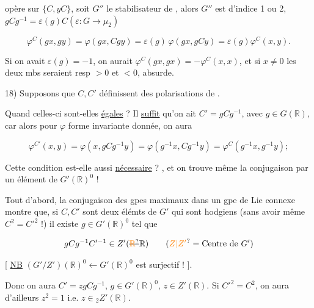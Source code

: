 opère sur $\{C,yC\}$,  soit $G''$ le stabilisateur de , alors $G''$ est d'indice 1 ou 2,    $gCg^{-1}=\varepsilon(g)C$\quad $(\varepsilon:G\longrightarrow\mu_2)$

\[
\varphi^C(gx,gy)=\varphi(gx,Cgy)=\varepsilon(g)\,\varphi(gx,gCy)=\varepsilon(g)\varphi^C(x,y).
\]


Si on avait $\varepsilon(g)=-1$, on aurait $\varphi^C(gx,gx)=-\varphi^C(x,x)$, et si $x\ne0$ les deux mbs seraient resp $>0$ et $<0$, absurde.


18) Supposons que $C,C'$ \deleted{\unsure{$\in$}}  définissent des polarisations de  .

Quand celles-ci sont-elles \uline{égales} ? Il \uline{suffit} qu'on ait $C'=gCg^{-1}$, avec $g\in G(\mathbb R)$, car alors pour $\varphi$ forme invariante donnée, on aura

\[
\varphi^{C'}(x,y)=\varphi(x,gCg^{-1}y)=\varphi(g^{-1}x,Cg^{-1}y)=\varphi^C(g^{-1}x,g^{-1}y);
\]

Cette condition est-elle aussi \uline{nécessaire} ? ,   et on trouve même \unsure{$=$} la conjugaison par un élément de $G'(\mathbb R)^0$ !


Tout d'abord, la conjugaison des gpes maximaux dans un gpe de Lie connexe montre que,  si $C,C'$ sont deux élémts de $G'$ qui sont hodgiens (sans avoir même $C^2=C'^2$ !) il existe $g\in G'(\mathbb R)^0$ tel que

\[
gCg^{-1}C'^{-1}\in Z'(\deleted{\unsure{\mathbb R}}\mathbb R)\qquad (\unsure{Z|Z'}=\text{Centre de }G')
\]

[ \uline{NB} $(G'/Z')(\mathbb R)^0\longleftarrow G'(\mathbb R)^0$ est surjectif ! ].

Donc on aura $C'=zgCg^{-1}$, $g\in G'(\mathbb R)^0$, $z\in Z'(\mathbb R)$. Si $C'^2=C^2$, on aura d'ailleurs $z^2=1$ i.e. $z\in {}_2Z'(\mathbb R)$.

